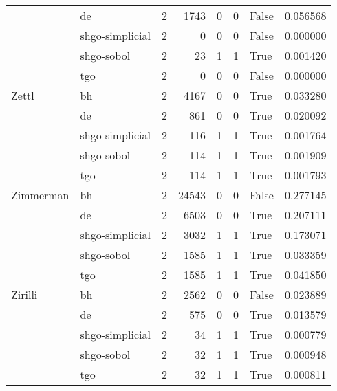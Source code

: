 \begin{longtable}{llrrrrlr}
         & de &     2 &     1743 &      0 &       0 &   False &    0.056568 \\
         & shgo-simplicial &     2 &        0 &      0 &       0 &   False &    0.000000 \\
         & shgo-sobol &     2 &       23 &      1 &       1 &    True &    0.001420 \\
         & tgo &     2 &        0 &      0 &       0 &   False &    0.000000 \\
Zettl & bh &     2 &     4167 &      0 &       0 &    True &    0.033280 \\
         & de &     2 &      861 &      0 &       0 &    True &    0.020092 \\
         & shgo-simplicial &     2 &      116 &      1 &       1 &    True &    0.001764 \\
         & shgo-sobol &     2 &      114 &      1 &       1 &    True &    0.001909 \\
         & tgo &     2 &      114 &      1 &       1 &    True &    0.001793 \\
Zimmerman & bh &     2 &    24543 &      0 &       0 &   False &    0.277145 \\
         & de &     2 &     6503 &      0 &       0 &    True &    0.207111 \\
         & shgo-simplicial &     2 &     3032 &      1 &       1 &    True &    0.173071 \\
         & shgo-sobol &     2 &     1585 &      1 &       1 &    True &    0.033359 \\
         & tgo &     2 &     1585 &      1 &       1 &    True &    0.041850 \\
Zirilli & bh &     2 &     2562 &      0 &       0 &   False &    0.023889 \\
         & de &     2 &      575 &      0 &       0 &    True &    0.013579 \\
         & shgo-simplicial &     2 &       34 &      1 &       1 &    True &    0.000779 \\
         & shgo-sobol &     2 &       32 &      1 &       1 &    True &    0.000948 \\
         & tgo &     2 &       32 &      1 &       1 &    True &    0.000811 \\
\end{longtable}

